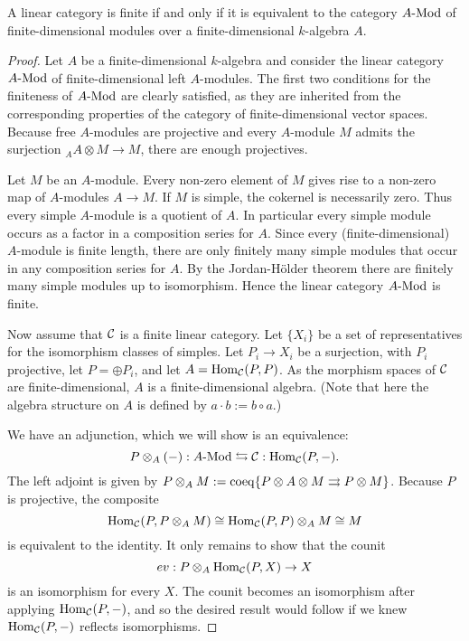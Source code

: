 \documentclass{amsart}
\begin{document}
\begin{proposition}
A linear category is finite if and only if it is equivalent to the category $\Mod{A}{}$ of finite-dimensional modules over a finite-dimensional $k$-algebra $A$.
\end{proposition}
\begin{proof}  
	Let $A$ be a finite-dimensional $k$-algebra and consider the linear category $\Mod{A}{}$ of finite-dimensional left $A$-modules. The first two conditions for the finiteness of $\Mod{A}{}$ are clearly satisfied, as they are inherited from the corresponding properties of the category of finite-dimensional vector spaces. Because free $A$-modules are projective and every $A$-module $M$ admits the surjection ${}_A A \otimes M \to M$, there are enough projectives. 
	
	Let $M$ be an $A$-module. Every non-zero element of $M$ gives rise to a non-zero map of $A$-modules $A \to M$. If $M$ is simple, the cokernel is necessarily zero.  Thus every simple $A$-module is a quotient of $A$. In particular every simple module occurs as a factor in a composition series for $A$. Since every (finite-dimensional) $A$-module is finite length, there are only finitely many simple modules that occur in any composition series for $A$.  By the Jordan-H\"older theorem there are finitely many simple modules up to isomorphism. Hence the linear category $\Mod{A}{}$ is finite.
	
	Now assume that $\mathcal C$ is a finite linear category. Let $\{X_i\}$ be a set of representatives for the isomorphism classes of simples. Let $P_i \to X_i$ be a surjection, with $P_i$ projective, let $P = \oplus P_i$, and let $A = \operatorname{Hom}_{\mathcal C}(P,P)$. As the morphism spaces of $\mathcal C$ are finite-dimensional, $A$ is a finite-dimensional algebra.  (Note that here the algebra structure on $A$ is defined by $a \cdot b := b \circ a$.)
	
We have an adjunction, which we will show is an equivalence:
	\begin{equation*}
		P \otimes_A (-):\Mod{A}{} \leftrightarrows \cC: \Hom_{\cC}(P,-).
	\end{equation*}
	The left adjoint is given by $P \otimes_A M := \operatorname{coeq}\{ P \otimes A \otimes M \rightrightarrows P \otimes M\}$. 
Because $P$ is projective, the composite
\begin{equation*}
	\operatorname{Hom}_{\mathcal C}(P, P \otimes_A M) \cong \operatorname{Hom}_{\mathcal C}(P, P) \otimes_A M \cong M
\end{equation*}
 is equivalent to the identity. It only remains to show that the counit 
\begin{equation*}
	ev:P \otimes_A \operatorname{Hom}_{\mathcal C}(P, X) \to X
\end{equation*}
is an isomorphism for every $X$. The counit becomes an isomorphism after applying $\operatorname{Hom}_{\mathcal C}(P,-)$, and so the desired result would follow if we knew $\operatorname{Hom}_{\mathcal C}(P,-)$ reflects isomorphisms. 


\end{proof}
\end{document}
